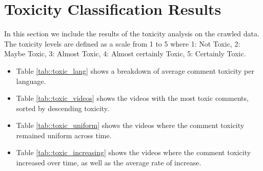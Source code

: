 \documentclass[11pt, a4paper]{article}
\begin{document}
	
	
	\section{Toxicity Classification Results}
	
	In this section we include the results of the toxicity analysis on the crawled data. The toxicity levels are defined as a scale from 1 to 5 where 1: Not Toxic, 	2: Maybe Toxic, 3: Almost Toxic,	4: Almost certainly Toxic, 5: Certainly Toxic.
	
	\begin{itemize}
		\item Table \ref{tab::toxic_lang} shows a breakdown of average comment toxicity per language. 
		
		\item Table \ref{tab::toxic_videos} shows the videos with the most toxic comments, sorted by descending toxicity.
		
		\item Table \ref{tab::toxic_uniform} shows the videos where the comment toxicity remained uniform across time.
		
		\item Table \ref{tab::toxic_increasing} shows the videos where the comment toxicity increased over time, as well as the average rate of increase. 
	\end{itemize}
	
	
	
	
	
	
	
	
	
\end{document}
